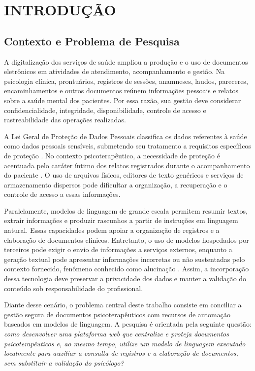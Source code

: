\chapter{INTRODUÇÃO}

\section{Contexto e Problema de Pesquisa}

A digitalização dos serviços de saúde ampliou a produção e o uso de documentos eletrônicos em atividades de atendimento, acompanhamento e gestão. Na psicologia clínica, prontuários, registros de sessões, anamneses, laudos, pareceres, encaminhamentos e outros documentos reúnem informações pessoais e relatos sobre a saúde mental dos pacientes. Por essa razão, sua gestão deve considerar confidencialidade, integridade, disponibilidade, controle de acesso e rastreabilidade das operações realizadas.

A Lei Geral de Proteção de Dados Pessoais classifica os dados referentes à saúde como dados pessoais sensíveis, submetendo seu tratamento a requisitos específicos de proteção \cite{brasil2018lei}. No contexto psicoterapêutico, a necessidade de proteção é acentuada pelo caráter íntimo dos relatos registrados durante o acompanhamento do paciente \cite{salles2023privacidade}. O uso de arquivos físicos, editores de texto genéricos e serviços de armazenamento dispersos pode dificultar a organização, a recuperação e o controle de acesso a essas informações.

Paralelamente, modelos de linguagem de grande escala permitem resumir textos, extrair informações e produzir rascunhos a partir de instruções em linguagem natural. Essas capacidades podem apoiar a organização de registros e a elaboração de documentos clínicos. Entretanto, o uso de modelos hospedados por terceiros pode exigir o envio de informações a serviços externos, enquanto a geração textual pode apresentar informações incorretas ou não sustentadas pelo contexto fornecido, fenômeno conhecido como alucinação \cite{ji2023survey}. Assim, a incorporação dessa tecnologia deve preservar a privacidade dos dados e manter a validação do conteúdo sob responsabilidade do profissional.

Diante desse cenário, o problema central deste trabalho consiste em conciliar a gestão segura de documentos psicoterapêuticos com recursos de automação baseados em modelos de linguagem. A pesquisa é orientada pela seguinte questão: \textit{como desenvolver uma plataforma web que centralize e proteja documentos psicoterapêuticos e, ao mesmo tempo, utilize um modelo de linguagem executado localmente para auxiliar a consulta de registros e a elaboração de documentos, sem substituir a validação do psicólogo?}

